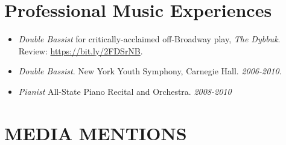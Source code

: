 \documentclass[margin]{res}
\newcommand{\fullhrulefill}{%
	\vspace{.7\baselineskip}
	\hspace*{-\sectionwidth}\hrulefill%
}
\begin{document}
\begin{resume}
\section{Professional Music Experiences}
\begin{itemize}
	\item {\sl Double Bassist} for critically-acclaimed off-Broadway play, \textit{The Dybbuk}. Review: \url{https://bit.ly/2FDSrNB}.
	\item {\sl Double Bassist}. New York Youth Symphony, Carnegie Hall. \hfill \textit{2006-2010}.
	\item \textit{Pianist} All-State Piano Recital and Orchestra. \hfill \textit{2008-2010}
\end{itemize}


\vspace{1\baselineskip}
\section{MEDIA MENTIONS}
\vspace{1\baselineskip}
\fullhrulefill

\end{resume}
\end{document}
